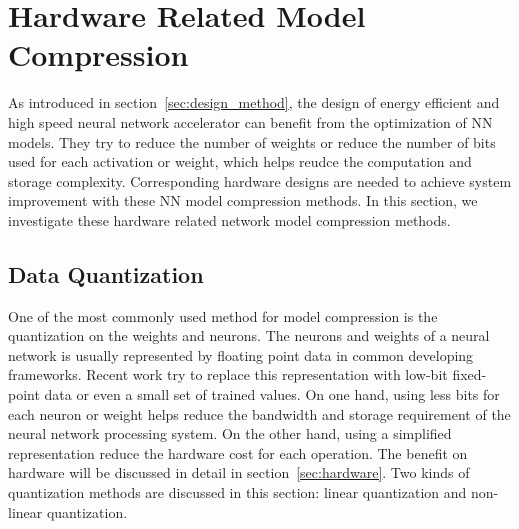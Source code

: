 \section{Hardware Related Model Compression}\label{sec:software}

As introduced in section~\ref{sec:design_method}, the design of energy efficient and high speed neural network accelerator can benefit from the optimization of NN models.  They try to reduce the number of weights or reduce the number of bits used for each activation or weight, which helps reudce the computation and storage complexity. Corresponding hardware designs are needed to achieve system improvement with these NN model compression methods. In this section, we investigate these hardware related network model compression methods.

\subsection{Data Quantization}\label{sec:software:quant}
One of the most commonly used method for model compression is the quantization on the weights and neurons. The neurons and weights of a neural network is usually represented by floating point data in common developing frameworks. Recent work try to replace this representation with low-bit fixed-point data or even a small set of trained values. On one hand, using less bits for each neuron or weight helps reduce the bandwidth and storage requirement of the neural network processing system. On the other hand, using a simplified representation reduce the hardware cost for each operation. The benefit on hardware will be discussed in detail in section~\ref{sec:hardware}. Two kinds of quantization methods are discussed in this section: linear quantization and non-linear quantization.

